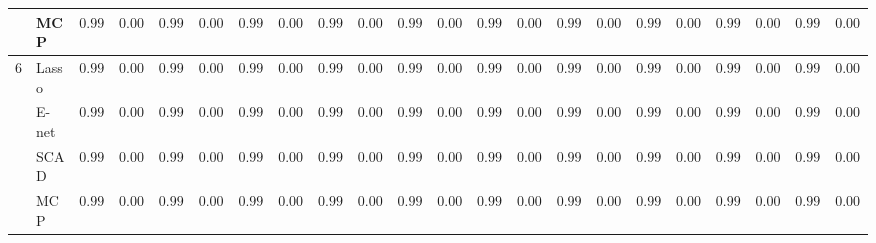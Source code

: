\begin{tabular}{ll|ll|llllll|llllll|llllll}
	& MCP  & $0.9991$ & $0.0013$ & $0.9991$ & $0.0012$ & $0.9997$ & $0.0006$ & $0.9997$ & $0.0005$ & $0.9990$ & $0.0012$ & $0.9990$ & $0.0013$ & $0.9994$ & $0.0010$ & $0.9991$ & $0.0012$ & $0.9993$ & $0.0010$ & $0.9995$ & $0.0009$ \\\hline
	6 & Lasso  & $0.9966$ & $0.0031$ & $0.9955$ & $0.0031$ & $0.9942$ & $0.0036$ & $0.9959$ & $0.0023$ & $0.9965$ & $0.0029$ & $0.9972$ & $0.0033$ & $0.9990$ & $0.0018$ & $0.9960$ & $0.0030$ & $0.9955$ & $0.0051$ & $0.9988$ & $0.0012$ \\
	& E-net  & $0.9955$ & $0.0034$ & $0.9946$ & $0.0032$ & $0.9932$ & $0.0037$ & $0.9928$ & $0.0027$ & $0.9957$ & $0.0030$ & $0.9967$ & $0.0039$ & $0.9985$ & $0.0022$ & $0.9952$ & $0.0033$ & $0.9960$ & $0.0052$ & $0.9970$ & $0.0017$ \\
	& SCAD  & $0.9966$ & $0.0034$ & $0.9965$ & $0.0032$ & $0.9979$ & $0.0024$ & $0.9991$ & $0.0015$ & $0.9970$ & $0.0032$ & $0.9956$ & $0.0035$ & $0.9976$ & $0.0033$ & $0.9967$ & $0.0034$ & $0.9964$ & $0.0033$ & $0.9986$ & $0.0021$ \\
	& MCP  & $0.9991$ & $0.0013$ & $0.9991$ & $0.0012$ & $0.9997$ & $0.0006$ & $0.9997$ & $0.0005$ & $0.9991$ & $0.0012$ & $0.9990$ & $0.0013$ & $0.9994$ & $0.0010$ & $0.9991$ & $0.0012$ & $0.9993$ & $0.0010$ & $0.9995$ & $0.0009$ \\
	\hline 
\end{tabular}